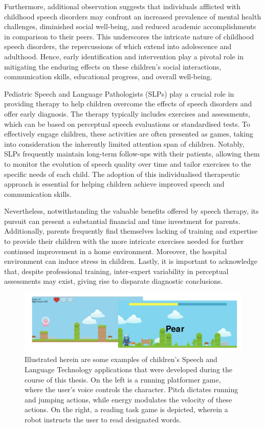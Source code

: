 Furthermore, additional observation \cite{langbecker2020long} suggests that individuals afflicted with childhood speech disorders may confront an increased prevalence of mental health challenges, diminished social well-being, and reduced academic accomplishments in comparison to their peers. This underscores the intricate nature of childhood speech disorders, the repercussions of which extend into adolescence and adulthood. Hence,  early identification and intervention play a pivotal role in mitigating the enduring effects on these children's social interactions, communication skills, educational progress, and overall well-being.

Pediatric Speech and Language Pathologists (SLPs) play a crucial role in providing therapy to help children overcome the effects of speech disorders and offer early diagnosis. The therapy typically includes exercises and assessments, which can be based on perceptual speech evaluations or standardised tests. To effectively engage children, these activities are often presented as games, taking into consideration the inherently limited attention span of children. Notably, SLPs frequently maintain long-term follow-ups with their patients, allowing them to monitor the evolution of speech quality over time and tailor exercises to the specific needs of each child. The adoption of this individualised therapeutic approach is essential for helping children achieve improved speech and communication skills.

Nevertheless, notwithstanding the valuable benefits offered by speech therapy, its pursuit can present a substantial financial and time investment for parents. Additionally, parents frequently find themselves lacking of training and expertise to provide their children with the more intricate exercises needed for further continued improvement in a home environment. Moreover, the hospital environment can induce stress in children. Lastly, it is important to acknowledge that, despite professional training, inter-expert variability in perceptual assessments may exist, giving rise to disparate diagnostic conclusions.

\begin{figure}
    \centering
    \includegraphics[width=1\textwidth]{imgs/exampleSLT.png}
    \caption{Illustrated herein are some examples of children's Speech and Language Technology applications that were developed during the course of this thesis. On the left is a running platformer game, where the user's voice controls the character. Pitch dictates running and jumping actions, while energy modulates the velocity of these actions. On the right, a reading task game is depicted, wherein a robot instructs the user to read designated words.}
    \label{fig:exSLT}

\end{figure}

